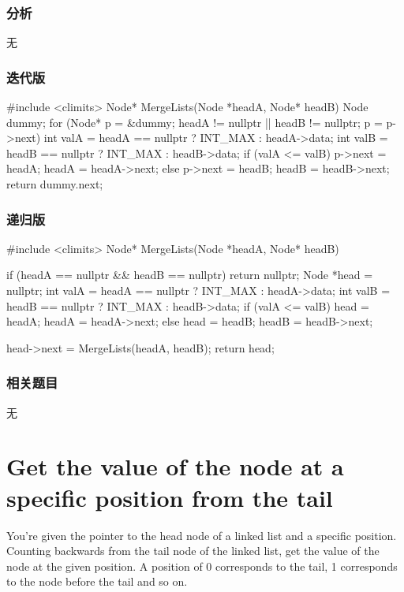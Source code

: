 \subsubsection{分析}
无


\subsubsection{迭代版}
\begin{Code}
#include <climits>
Node* MergeLists(Node *headA, Node* headB) {
    Node dummy;
    for (Node* p = &dummy; headA != nullptr || headB != nullptr; p = p->next) {
        int valA = headA == nullptr ? INT_MAX : headA->data;
        int valB = headB == nullptr ? INT_MAX : headB->data;
        if (valA <= valB) {
            p->next = headA;
            headA = headA->next;
        } else {
            p->next = headB;
            headB = headB->next;
        }
    }
    return dummy.next;
}
\end{Code}


\subsubsection{递归版}
\begin{Code}
#include <climits>
Node* MergeLists(Node *headA, Node* headB) {
    if (headA == nullptr && headB == nullptr) return nullptr;
    Node *head = nullptr;
    int valA = headA == nullptr ? INT_MAX : headA->data;
    int valB = headB == nullptr ? INT_MAX : headB->data;
    if (valA <= valB) {
        head = headA;
        headA = headA->next;
    } else {
        head = headB;
        headB = headB->next;
    }

    head->next = MergeLists(headA, headB);
    return head;
}
\end{Code}


\subsubsection{相关题目}
\begindot
\item 无
\myenddot


\section{Get the value of the node at a specific position from the tail} %
\label{sec:Get-the-value-of-the-node-at-a-specific-position-from-the-tail}

You’re given the pointer to the head node of a linked list and a specific position. Counting backwards from the tail node of the linked list, get the value of the node at the given position. A position of 0 corresponds to the tail, 1 corresponds to the node before the tail and so on.


